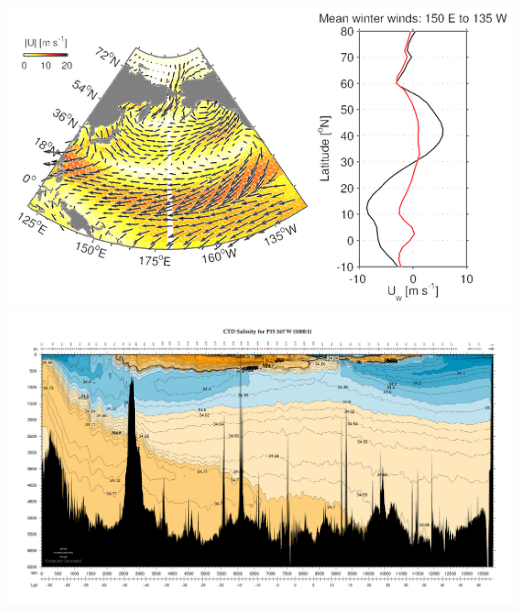 \includegraphics{figs/Coriolis/PacificWindsSm}
\includegraphics{figs/WaterMasses/P15_CTDSAL_all_1000}

